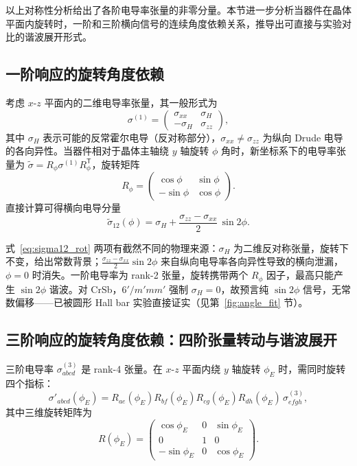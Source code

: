 以上对称性分析给出了各阶电导率张量的非零分量。本节进一步分析当器件在晶体平面内旋转时，一阶和三阶横向信号的连续角度依赖关系，推导出可直接与实验对比的谐波展开形式。

\subsection{一阶响应的旋转角度依赖}

考虑 \(x\)-\(z\) 平面内的二维电导率张量，其一般形式为
\begin{equation}
  \sigma^{(1)} = \begin{pmatrix}
    \sigma_{xx} & \sigma_H \\
    -\sigma_H & \sigma_{zz}
  \end{pmatrix},
  \label{eq:sigma_2d}
\end{equation}
其中 \(\sigma_H\) 表示可能的反常霍尔电导（反对称部分），\(\sigma_{xx}\neq\sigma_{zz}\) 为纵向 Drude 电导的各向异性。当器件相对于晶体主轴绕 \(y\) 轴旋转 \(\phi\) 角时，新坐标系下的电导率张量为 \(\tilde{\sigma}=R_\phi\sigma^{(1)} R_\phi^{\mathsf{T}}\)，旋转矩阵
\begin{equation}
  R_\phi = \begin{pmatrix}
    \cos\phi & \sin\phi \\
    -\sin\phi & \cos\phi
  \end{pmatrix}.
\end{equation}
直接计算可得横向电导分量
\begin{equation}
  \tilde{\sigma}_{12}(\phi) = \sigma_H + \frac{\sigma_{zz}-\sigma_{xx}}{2}\,\sin 2\phi.
  \label{eq:sigma12_rot}
\end{equation}

式~\eqref{eq:sigma12_rot} 两项有截然不同的物理来源：\(\sigma_H\) 为二维反对称张量，旋转下不变，给出常数背景；\(\frac{\sigma_{zz}-\sigma_{xx}}{2}\sin 2\phi\) 来自纵向电导率各向异性导致的横向泄漏，\(\phi=0\) 时消失。一阶电导率为 rank-2 张量，旋转携带两个 \(R_\phi\) 因子，最高只能产生 \(\sin 2\phi\) 谐波。对 CrSb，\(6'/m'mm'\) 强制 \(\sigma_H=0\)，故预言纯 \(\sin 2\phi\) 信号，无常数偏移——已被圆形 Hall bar 实验直接证实（见第~\ref{fig:angle_fit} 节）。

\subsection{三阶响应的旋转角度依赖：四阶张量转动与谐波展开}

三阶电导率 \(\sigma_{abcd}^{(3)}\) 是 rank-4 张量。在 \(x\)-\(z\) 平面内绕 \(y\) 轴旋转 \(\phi_E\) 时，需同时旋转四个指标：
\begin{equation}
  \sigma'_{abcd}(\phi_E) = R_{ae}(\phi_E)R_{bf}(\phi_E)R_{cg}(\phi_E)R_{dh}(\phi_E)\,\sigma_{efgh}^{(3)},
  \label{eq:rank4_rotation}
\end{equation}
其中三维旋转矩阵为
\begin{equation}
  R(\phi_E) = \begin{pmatrix}
    \cos\phi_E & 0 & \sin\phi_E \\
    0 & 1 & 0 \\
    -\sin\phi_E & 0 & \cos\phi_E
  \end{pmatrix}.
  \label{eq:R3d}
\end{equation}

